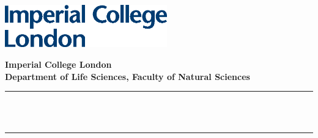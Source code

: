 \begin{titlepage}

    \newcommand{\HRule}{\rule{\linewidth}{0.5mm}} %


    \includegraphics[width=7cm]{img/logo.eps}\\[1cm]


    \center %


    \textbf{\large Imperial College London}\\[0.8 cm] %
    \textbf{\large Department of Life Sciences, Faculty of Natural Sciences}\\[0.8 cm] %
    \makeatletter
    \HRule \\[0.6cm]
    { \huge \bfseries \@title}\\[0.6cm] %
    \HRule \\[1.5cm]


\end{titlepage}
